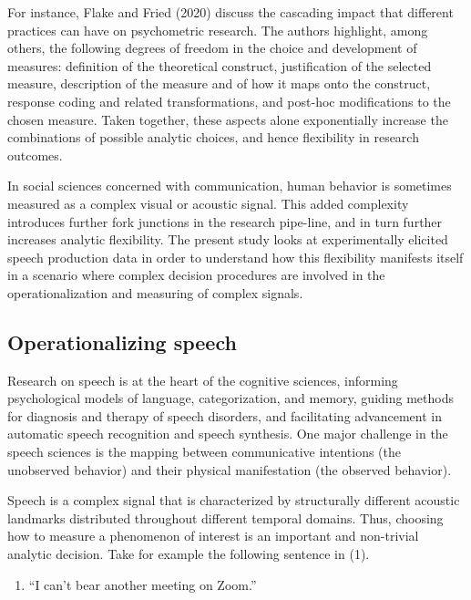 \documentclass[
  12pt,
]{article}
\providecommand{\tightlist}{%
  \setlength{\itemsep}{0pt}\setlength{\parskip}{0pt}}
\begin{document}
For instance, Flake and Fried (2020) discuss the cascading impact that different practices can have on psychometric research.
The authors highlight, among others, the following degrees of freedom in the choice and development of measures: definition of the theoretical construct, justification of the selected measure, description of the measure and of how it maps onto the construct, response coding and related transformations, and post-hoc modifications to the chosen measure.
Taken together, these aspects alone exponentially increase the combinations of possible analytic choices, and hence flexibility in research outcomes.

In social sciences concerned with communication, human behavior is sometimes measured as a complex visual or acoustic signal.
This added complexity introduces further fork junctions in the research pipe-line, and in turn further increases analytic flexibility.
The present study looks at experimentally elicited speech production data in order to understand how this flexibility manifests itself in a scenario where complex decision procedures are involved in the operationalization and measuring of complex signals.

\hypertarget{s:operspeech}{%
\subsection{Operationalizing speech}\label{s:operspeech}}

Research on speech is at the heart of the cognitive sciences, informing psychological models of language, categorization, and memory, guiding methods for diagnosis and therapy of speech disorders, and facilitating advancement in automatic speech recognition and speech synthesis.
One major challenge in the speech sciences is the mapping between communicative intentions (the unobserved behavior) and their physical manifestation (the observed behavior).

Speech is a complex signal that is characterized by structurally different acoustic landmarks distributed throughout different temporal domains.
Thus, choosing how to measure a phenomenon of interest is an important and non-trivial analytic decision.
Take for example the following sentence in (1).

\vspace{1em}

\begin{enumerate}
\def\labelenumi{(\arabic{enumi})}
\tightlist
\item
  ``I can't bear another meeting on Zoom.''
  \vspace{1em}
\end{enumerate}
\end{document}
